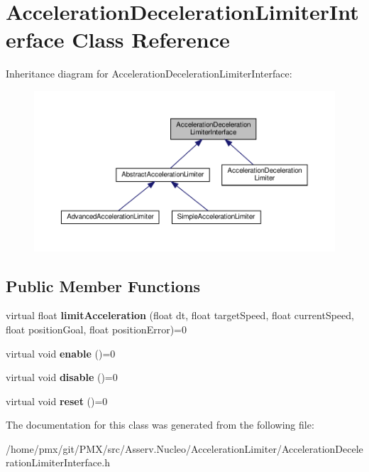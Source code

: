 \hypertarget{classAccelerationDecelerationLimiterInterface}{}\section{Acceleration\+Deceleration\+Limiter\+Interface Class Reference}
\label{classAccelerationDecelerationLimiterInterface}


Inheritance diagram for Acceleration\+Deceleration\+Limiter\+Interface\+:
\nopagebreak
\begin{figure}[H]
\begin{center}
\leavevmode
\includegraphics[width=350pt]{classAccelerationDecelerationLimiterInterface__inherit__graph}
\end{center}
\end{figure}
\subsection*{Public Member Functions}
\begin{DoxyCompactItemize}
\item 
\mbox{\label{classAccelerationDecelerationLimiterInterface_a79ab2e74990c0c5b7bc1aeb845391e6e}} 
virtual float {\bfseries limit\+Acceleration} (float dt, float target\+Speed, float current\+Speed, float position\+Goal, float position\+Error)=0
\item 
\mbox{\label{classAccelerationDecelerationLimiterInterface_a2ac64fa807ae69bdcb1757eb2f097258}} 
virtual void {\bfseries enable} ()=0
\item 
\mbox{\label{classAccelerationDecelerationLimiterInterface_a6b918565a9f3e2f405f806835acd1d34}} 
virtual void {\bfseries disable} ()=0
\item 
\mbox{\label{classAccelerationDecelerationLimiterInterface_aa6c307f1185f6ef888611277382e3679}} 
virtual void {\bfseries reset} ()=0
\end{DoxyCompactItemize}


The documentation for this class was generated from the following file\+:\begin{DoxyCompactItemize}
\item 
/home/pmx/git/\+P\+M\+X/src/\+Asserv.\+Nucleo/\+Acceleration\+Limiter/Acceleration\+Deceleration\+Limiter\+Interface.\+h\end{DoxyCompactItemize}
